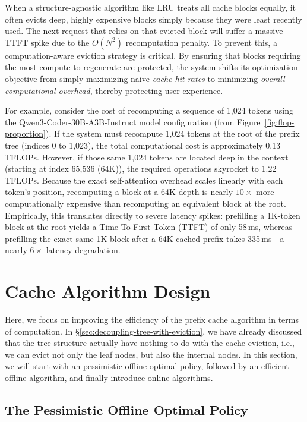\documentclass[letterpaper,twocolumn,10pt]{article}
\begin{document}
When a structure-agnostic algorithm like LRU treats all cache blocks equally, it
often evicts deep, highly expensive blocks simply because they were least recently used.
The next request that relies on that evicted block will suffer a massive TTFT spike
due to the $O(N^2)$ recomputation penalty. To prevent this, a computation-aware
eviction strategy is critical. By ensuring that blocks requiring the most compute to
regenerate are protected, the system shifts its optimization objective from simply
maximizing naive \textit{cache hit rates} to minimizing \textit{overall computational
overhead}, thereby protecting user experience.

For example, consider the cost of recomputing a sequence of 1,024 tokens using the
Qwen3-Coder-30B-A3B-Instruct model configuration
(from Figure~\ref{fig:flop-proportion}).
If the system must recompute 1,024 tokens at the root of the prefix tree
(indices 0 to 1,023), the total computational cost is approximately 0.13\,TFLOPs.
However, if those same 1,024 tokens are located deep in the context
(starting at index 65,536 (64K)), the required operations skyrocket to 1.22\,TFLOPs.
Because the exact self-attention overhead scales linearly with each token's position,
recomputing a block at a 64K depth is nearly $10\times$ more computationally
expensive than recomputing an equivalent block at the root.
Empirically, this translates directly to severe latency spikes: prefilling a 1K-token
block at the root yields a Time-To-First-Token (TTFT) of only 58\,ms, whereas prefilling
the exact same 1K block after a 64K cached prefix takes 335\,ms---a nearly $6\times$
latency degradation.


\section{Cache Algorithm Design}

Here, we focus on improving the efficiency of the prefix cache algorithm in
terms of computation. In \S\ref{sec:decoupling-tree-with-eviction}, we
have already discussed that the tree structure actually have nothing to do
with the cache eviction, i.e., we can evict not only the leaf nodes, but also
the internal nodes. In this section, we will start with an pessimistic offline
optimal policy, followed by an efficient offline algorithm, and finally
introduce online algorithms.



\subsection{The Pessimistic Offline Optimal Policy}
\end{document}
